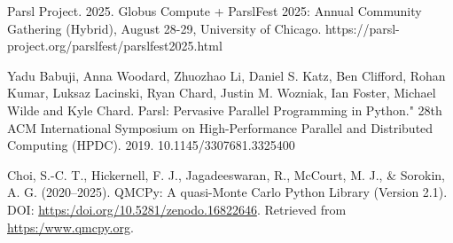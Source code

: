 \begin{thebibliography}{6}

Parsl Project. 2025. Globus Compute + ParslFest 2025: Annual Community Gathering (Hybrid), August 28-29, University of Chicago. https://parsl-project.org/parslfest/parslfest2025.html

Yadu Babuji, Anna Woodard, Zhuozhao Li, Daniel S. Katz, Ben Clifford, Rohan Kumar, Luksaz Lacinski, Ryan Chard, Justin M. Wozniak, Ian Foster, Michael Wilde and Kyle Chard. Parsl: Pervasive Parallel Programming in Python." 28th ACM International Symposium on High-Performance Parallel and Distributed Computing (HPDC). 2019. 10.1145/3307681.3325400

Choi, S.-C. T., Hickernell, F. J., Jagadeeswaran, R., McCourt, M. J., \& Sorokin, A. G. (2020--2025).
QMCPy: A quasi-Monte Carlo Python Library (Version 2.1).
DOI: \url{https:/doi.org/10.5281/zenodo.16822646}. 
Retrieved from \url{https:/www.qmcpy.org}.



\end{thebibliography}
